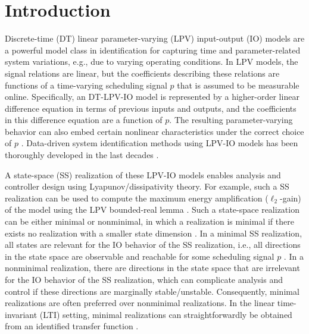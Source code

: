 \section{Introduction}
\label{sec:introduction}
Discrete-time (DT) linear parameter-varying (LPV) input-output (IO) models \cite{Shamma2012, Toth2012} are a powerful model class in identification for capturing time and parameter-related system variations, e.g., due to varying operating conditions. In LPV models, the signal relations are linear, but the coefficients describing these relations are functions of a time-varying scheduling signal $p$ that is assumed to be measurable online. Specifically, an DT-LPV-IO model is represented by a higher-order linear difference equation in terms of previous inputs and outputs, and the coefficients in this difference equation are a function of $p$. The resulting parameter-varying behavior can also embed certain nonlinear characteristics under the correct choice of $p$ \cite{Leith2000a}. 
Data-driven system identification methods using LPV-IO models has been thoroughly developed in the last decades \cite{Bachnas2014,Bamieh2000,Bamieh2002, Previdi2003, Butcher2008, Laurain2010, Mercere2011a, Zhao2012a}.

A state-space (SS) realization of these LPV-IO models enables analysis and controller design using Lyapunov/dissipativity theory\cite{Shamma2012, LMIsLectureNotes,Caverly2019}. For example, such a SS realization can be used to compute the maximum energy amplification ($\ell_2$-gain) of the model using the LPV bounded-real lemma \cite{Apkarian1995}. Such a state-space realization can be either minimal or nonminimal, in which a realization is minimal if there exists no realization with a smaller state dimension \cite{Silverman1969, Gohberg1992}. In a minimal SS realization, all states are relevant for the IO behavior of the SS realization, i.e., all directions in the state space are observable and reachable for some scheduling signal $p$ \cite{Gohberg1992}.
In a nonminimal realization, there are directions in the state space that are irrelevant for the IO behavior of the SS realization, which can complicate analysis and control if these directions are marginally stable/unstable. Consequently, minimal realizations are often preferred over nonminimal realizations. In the linear time-invariant (LTI) setting, minimal realizations can straightforwardly be obtained from an identified transfer function \cite{DeSchutter2000}.


